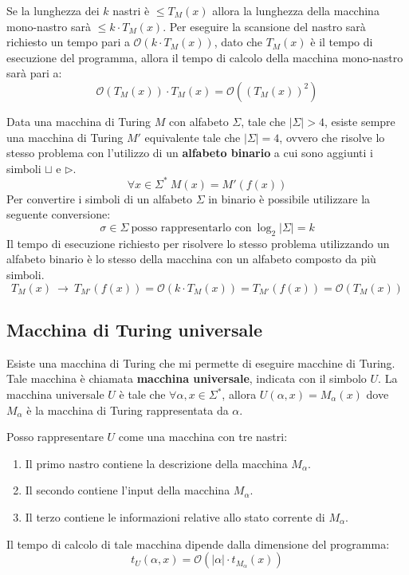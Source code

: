 \begin{dimostrazione}
    Se la lunghezza dei $k$ nastri è $\leq T_M(x)$ allora la lunghezza della
    macchina mono-nastro sarà $\leq k \cdot T_M(x)$. Per eseguire la scansione
    del nastro sarà richiesto un tempo pari a $\mathcal{O}(k \cdot T_M(x))$,
    dato che $T_M(x)$ è il tempo di esecuzione del programma, allora il tempo di
    calcolo della macchina mono-nastro sarà pari a:
    \begin{equation}
        \mathcal{O}(T_M(x)) \cdot T_M(x) = \mathcal{O}((T_M(x))^2)
    \end{equation}
\end{dimostrazione}
Data una macchina di Turing $M$ con alfabeto $\Sigma$, tale che $|\Sigma| > 4$,
esiste sempre una macchina di Turing $M'$ equivalente tale che $|\Sigma| = 4$,
ovvero che risolve lo stesso problema con l'utilizzo di un \textbf{alfabeto
    binario} a cui sono aggiunti i simboli $\sqcup$ e $\triangleright$.
\begin{equation}
    \forall x \in \Sigma ^ \ast \ M(x) = M'(f(x))
\end{equation}
Per convertire i simboli di un alfabeto $\Sigma$ in binario è possibile utilizzare
la seguente conversione:
\begin{equation}
    \sigma \in \Sigma \ \text{posso rappresentarlo con} \ \log_{2}|\Sigma | = k
\end{equation}
Il tempo di esecuzione richiesto per risolvere lo stesso problema utilizzando un
alfabeto binario è lo stesso della macchina con un alfabeto composto da più simboli.
\begin{equation}
    T_M(x) \ \to \ T_{M'}(f(x)) = \mathcal{O}(k \cdot T_M(x)) = T_{M'}(f(x)) =
    \mathcal{O}(T_M(x))
\end{equation}
\subsection{Macchina di Turing universale}
Esiste una macchina di Turing che mi permette di eseguire macchine di Turing.
Tale macchina è chiamata \textbf{macchina universale}, indicata con il simbolo
$U$. La macchina universale $U$ è tale che $\forall \alpha, x \in \Sigma^{\ast}$,
allora $U(\alpha, x) = M_{\alpha}(x)$ dove $M_{\alpha}$ è la macchina di Turing
rappresentata da $\alpha$.

Posso rappresentare $U$ come una macchina con tre nastri:
\begin{enumerate}
    \item Il primo nastro contiene la descrizione della macchina $M_{\alpha}$.
    \item Il secondo contiene l'input della macchina $M_{\alpha}$.
    \item Il terzo contiene le informazioni relative allo stato corrente di $M_{\alpha}$.
\end{enumerate}
Il tempo di calcolo di tale macchina dipende dalla dimensione del programma:
\begin{equation}
    t_U(\alpha, x) = \mathcal{O}(|\alpha| \cdot t_{M_{\alpha}}(x))
\end{equation}
